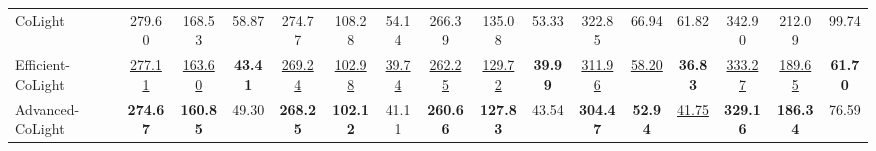 \begin{table}[t]
{\begin{tabular}{l|ccc|ccc|ccc|ccc|ccc}
        CoLight & 279.60 & 168.53 & 58.87 & 274.77 & 108.28 & 54.14 & 266.39 & 135.08 & 53.33 & 322.85 & 66.94 & 61.82 & 342.90 & 212.09 & 99.74 \\
        Efficient-CoLight & \underline{277.11} & \underline{163.60} & \textbf{43.41} & \underline{269.24} & \underline{102.98} & \underline{39.74} & \underline{262.25} & \underline{129.72} & \textbf{39.99} & \underline{311.96} & \underline{58.20} & \textbf{36.83} & \underline{333.27} & \underline{189.65} & \textbf{61.70} \\
        Advanced-CoLight & \textbf{274.67} & \textbf{160.85} & 49.30 & \textbf{268.25} & \textbf{102.12} & 41.11 & \textbf{260.66} & \textbf{127.83} & 43.54 & \textbf{304.47} & \textbf{52.94} & \underline{41.75} & \textbf{329.16} & \textbf{186.34} & 76.59 \\
        \bottomrule
    \end{tabular}%
    }
\end{table}

